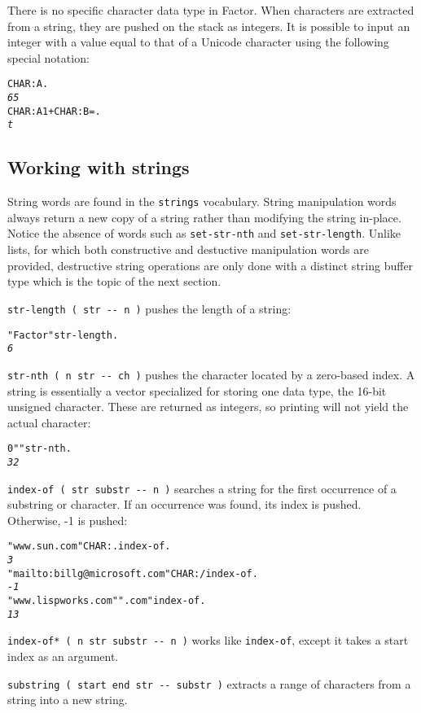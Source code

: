 \documentclass[english]{article}
\begin{document}
{There is no specific character data type in Factor. When characters
are extracted from a string, they are pushed on the stack as integers.
It is possible to input an integer with a value equal to that of a
Unicode character using the following special notation:

\begin{alltt}
CHAR: A .
\emph{65}
CHAR: A 1 + CHAR: B = .
\emph{t}
\end{alltt}

\subsection{Working with strings}

String words are found in the \texttt{strings} vocabulary. String
manipulation words always return a new copy of a string rather than
modifying the string in-place. Notice the absence of words such as
\texttt{set-str-nth} and \texttt{set-str-length}. Unlike lists, for
which both constructive and destuctive manipulation words are provided,
destructive string operations are only done with a distinct string
buffer type which is the topic of the next section.

\texttt{str-length ( str -{}- n )} pushes the length of a string:

\begin{alltt}
"Factor" str-length .
\emph{6}
\end{alltt}
\texttt{str-nth ( n str -{}- ch )} pushes the character located by
a zero-based index. A string is essentially a vector specialized for
storing one data type, the 16-bit unsigned character. These are returned
as integers, so printing will not yield the actual character:
\begin{alltt}
0 " " str-nth .
\emph{32}
\end{alltt}
\texttt{index-of ( str substr -{}- n )} searches a string for the
first occurrence of a substring or character. If an occurrence was
found, its index is pushed. Otherwise, -1 is pushed:

\begin{alltt}
"www.sun.com" CHAR: . index-of .
\emph{3}
"mailto:billg@microsoft.com" CHAR: / index-of .
\emph{-1}
"www.lispworks.com" ".com" index-of .
\emph{13}
\end{alltt}
\texttt{index-of{*} ( n str substr -{}- n )} works like \texttt{index-of},
except it takes a start index as an argument.

\texttt{substring ( start end str -{}- substr )} extracts a range
of characters from a string into a new string.

}
\end{document}
